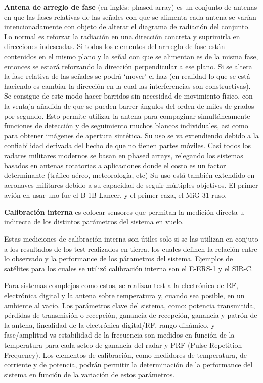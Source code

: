 \documentclass[a4paper,10pt]{article}
\begin{document}
{\textbf{Antena de arreglo de fase}} (en inglés: phased array) es un conjunto de
antenas en que las fases relativas de las señales con que se alimenta cada 
antena se varían intencionadamente con objeto de alterar el diagrama de 
radiación del conjunto. Lo normal es reforzar la radiación en una dirección 
concreta y suprimirla en direcciones indeseadas. Si todos los elementos del 
arrreglo de fase están contenidos en el mismo plano y la señal con que se 
alimentan es de la misma fase, entonces se estará reforzando la dirección 
perpendicular a ese plano. Si se altera la fase relativa de las señales se podrá
 \enquote*{mover} el haz (en realidad lo que se está haciendo es cambiar la 
dirección en la cual las interferencias son constructivas). Se consigue de este
modo hacer barridos sin necesidad de movimiento físico, con la ventaja añadida
de que se pueden barrer ángulos del orden de miles de grados por segundo. Esto
permite utilizar la antena para compaginar simultáneamente funciones de 
detección y de seguimiento muchos blancos individuales, asi como para obtener 
imágenes de apertura sintética. Su uso se va extendiendo debido a la 
confiabilidad derivada del hecho de que no tienen partes móviles. Casi todos los
radares militares modernos se basan en phased arrays, relegando los sistemas 
basados en antenas rotatorias a aplicaciones donde el costo es un factor 
determinante (tráfico aéreo, meteorología, etc) Su uso está también extendido en
aeronaves militares debido a su capacidad de seguir múltiples objetivos. El 
primer avión en usar uno fue el B-1B Lancer, y el primer caza, el MiG-31 ruso.

{\textbf{Calibración interna}} es colocar sensores que permitan la medición 
directa u indirecta de los distintos parámetros del sistema en vuelo. 

Estas mediciones de calibración interna son útiles solo si se las utilizan en 
conjuto a los resultados de los test realizados en tierra. los cuales definen la
relación entre lo observado y la performance de los párametros del sistema. 
Ejemplos de satélites para los cuales se utilizó calibración interna son el 
E-ERS-1 y el SIR-C.
    
Para sistemas complejos como estos, se realizan test a la electrónica de RF, 
electrónica digital y la antena sobre temperatura y, cuando sea posible, en un 
ambiente al vacío. Los parámetros clave del sistema, como: potencia transmitida,
pérdidas de transmisión o recepción, ganancia de recepción, ganancia y patrón de
la antena, linealidad de la electrónica digital/RF, rango dinámico, y 
fase/amplitud vs estabilidad de la frecuencia son medidos en función de la 
temperatura para cada seteo de ganancia del radar y PRF (Pulse Repetition 
Frequency). Los elementos de calibración, como medidores de temperatura, de 
corriente y de potencia, podrán permitir la determinación de la performance del 
sistema en función de la variación de estos parámetros.
    
\end{document}
